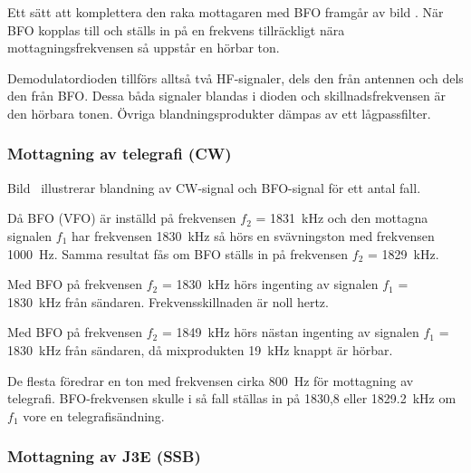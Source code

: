 Ett sätt att komplettera den raka mottagaren med BFO framgår av bild
.
När BFO kopplas till och ställs in på en frekvens tillräckligt
nära mottagningsfrekvensen så uppstår en hörbar ton.

Demodulatordioden tillförs alltså två HF-signaler, dels den från antennen och
dels den från BFO.
Dessa båda signaler blandas i dioden och skillnadsfrekvensen är den hörbara
tonen.
Övriga blandningsprodukter dämpas av ett lågpassfilter.



\newpage
\subsubsection{Mottagning av telegrafi (CW)}

Bild~ illustrerar blandning av CW-signal och BFO-signal
för ett antal fall.

Då BFO (VFO) är inställd på frekvensen \(f_2\) = \qty{1831}{\kilo\hertz} och den
mottagna signalen \(f_1\) har frekvensen \qty{1830}{\kilo\hertz} så hörs en
svävningston med frekvensen \qty{1000}{\hertz}.
Samma resultat fås om BFO ställs in på frekvensen \(f_2\) =
\qty{1829}{\kilo\hertz}.

Med BFO på frekvensen \(f_2\) = \qty{1830}{\kilo\hertz} hörs ingenting av
signalen \(f_1\) = \qty{1830}{\kilo\hertz} från sändaren.
Frekvensskillnaden är noll hertz.

Med BFO på frekvensen \(f_2\) = \qty{1849}{\kilo\hertz} hörs nästan ingenting av
signalen \(f_1\) = \qty{1830}{\kilo\hertz} från sändaren, då mixprodukten
\qty{19}{\kilo\hertz} knappt är hörbar.

De flesta föredrar en ton med frekvensen cirka \qty{800}{\hertz} för mottagning
av telegrafi.
BFO-frekvensen skulle i så fall ställas in på 1830,8 eller
\qty{1829,2}{\kilo\hertz} om \(f_1\) vore en telegrafisändning.


\subsubsection{Mottagning av J3E (SSB)}

